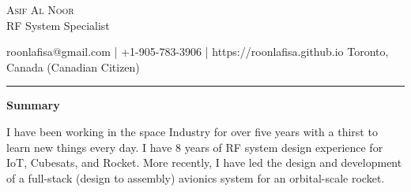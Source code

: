 \documentclass[10pt,A4]{article}
\newcommand{\cvsection}[1]
{
	\begin{center}
		\large\textcolor{sectcol}{\textbf{#1}}
	\end{center}
}
\newcommand{\metasection}[2]
{
\footnotesize{#2} \hspace*{\fill} \footnotesize{#1}\\[1pt]
}
\begin{document}
\pagestyle{fancy}	








\vspace{-8pt}
\begin{center}
	\HUGE \textsc{Asif Al Noor} \\[2pt]
	\small RF System Specialist
\end{center}



\vspace{6pt}


\metasection{Toronto, Canada (Canadian Citizen)}{roonlafisa@gmail.com | +1-905-783-3906 | https://roonlafisa.github.io}
\vspace{-2pt}
\textcolor{softcol}{\hrule}
\vspace{6pt}

\normalsize

\vspace{-6pt}
\cvsection{Summary}
I have been working in the space Industry for over five years with a thirst to learn new things every day. I have 8 years of RF system design experience for IoT, Cubesats, and Rocket. More recently, I have led the design and development of a full-stack (design to assembly) avionics system for an orbital-scale rocket. \\
\end{document}

